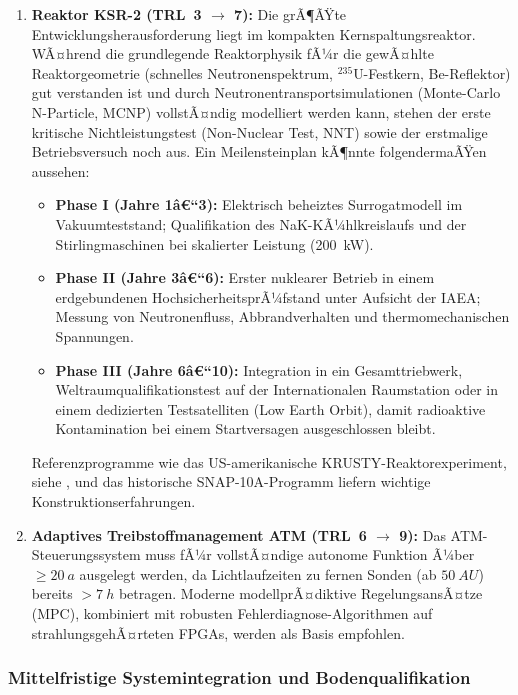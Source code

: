﻿\documentclass[a4paper,12pt,twoside]{article}
\theoremstyle{plain}
\theoremstyle{definition}
\theoremstyle{remark}
\begin{document}
\begin{enumerate}
		\item \textbf{Reaktor KSR-2 (TRL~3 $\to$ 7):}
		Die grÃ¶ÃŸte Entwicklungsherausforderung liegt im kompakten Kernspaltungsreaktor.
		WÃ¤hrend die grundlegende Reaktorphysik fÃ¼r die gewÃ¤hlte Reaktorgeometrie
		(schnelles Neutronenspektrum, $^{235}$U-Festkern, Be-Reflektor) gut verstanden
		ist und durch Neutronentransportsimulationen (Monte-Carlo N-Particle, MCNP)
		vollstÃ¤ndig modelliert werden kann, stehen der erste kritische Nichtleistungstest
		(Non-Nuclear Test, NNT) sowie der erstmalige Betriebsversuch noch aus. Ein
		Meilensteinplan kÃ¶nnte folgendermaÃŸen aussehen:
		\begin{itemize}
			\item \textbf{Phase I (Jahre 1â€“3):} Elektrisch beheiztes Surrogatmodell im
			Vakuumteststand; Qualifikation des NaK-KÃ¼hlkreislaufs und der Stirlingmaschinen
			bei skalierter Leistung (\SI{200}{kW}).
			\item \textbf{Phase II (Jahre 3â€“6):} Erster nuklearer Betrieb in einem
			erdgebundenen HochsicherheitsprÃ¼fstand unter Aufsicht der IAEA; Messung von
			Neutronenfluss, Abbrandverhalten und thermomechanischen Spannungen.
			\item \textbf{Phase III (Jahre 6â€“10):} Integration in ein Gesamttriebwerk,
			Weltraumqualifikationstest auf der Internationalen Raumstation oder in einem
			dedizierten Testsatelliten (Low Earth Orbit), damit radioaktive Kontamination
			bei einem Startversagen ausgeschlossen bleibt.
		\end{itemize}
		Referenzprogramme wie das US-amerikanische KRUSTY-Reaktorexperiment, siehe 
		\cite{dewar2004}, und das historische SNAP-10A-Programm liefern wichtige
		Konstruktionserfahrungen.

		\item \textbf{Adaptives Treibstoffmanagement ATM (TRL~6 $\to$ 9):}
		Das ATM-Steuerungs\-system muss fÃ¼r vollstÃ¤ndige autonome Funktion Ã¼ber
		$\geq\SI{20}{a}$ ausgelegt werden, da Lichtlaufzeiten zu fernen Sonden
		(ab $\SI{50}{AU}$) bereits $>\SI{7}{h}$ betragen. Moderne modellprÃ¤diktive
		RegelungsansÃ¤tze (MPC), kombiniert mit robusten Fehlerdiagnose-Algorithmen
		auf strahlungsgehÃ¤rteten FPGAs, werden als Basis empfohlen.
	\end{enumerate}

	\subsubsection{Mittelfristige Systemintegration und Bodenqualifikation}
\end{document}
